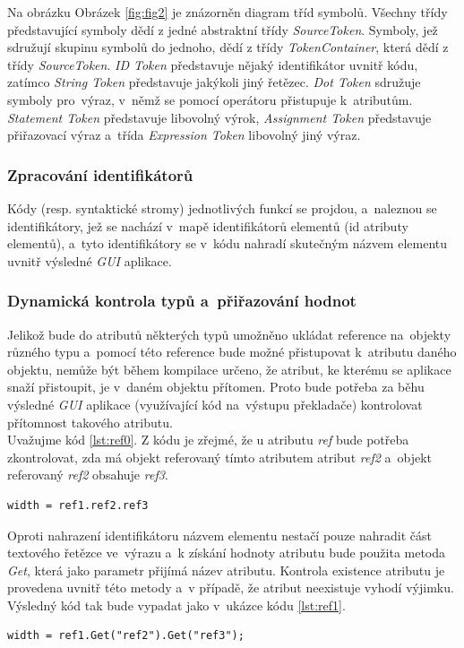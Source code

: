 \documentclass[11pt,twoside,a4paper]{book}
\begin{document}
Na obrázku Obrázek \ref{fig:fig2} je znázorněn diagram tříd symbolů. Všechny třídy představující symboly dědí z jedné abstraktní třídy \textit{SourceToken}. Symboly, jež sdružují skupinu symbolů do jednoho, dědí z třídy \textit{TokenContainer}, která dědí z třídy \textit{SourceToken}. \textit{ID Token} představuje nějaký identifikátor uvnitř kódu, zatímco \textit{String Token} představuje jakýkoli jiný řetězec. \textit{Dot Token} sdružuje symboly pro~výraz, v~němž se pomocí operátoru  přistupuje k~atributům. \textit{Statement Token} představuje libovolný výrok, \textit{Assignment Token} představuje přiřazovací výraz a~třída \textit{Expression Token} libovolný jiný výraz.

\subsubsection{Zpracování identifikátorů}
Kódy (resp. syntaktické stromy) jednotlivých funkcí se projdou, a~naleznou se identifikátory, jež se nachází v~mapě identifikátorů elementů (id atributy elementů), a~tyto identifikátory se v~kódu nahradí skutečným názvem elementu uvnitř výsledné \textit{GUI} aplikace.
\subsubsection{Dynamická kontrola typů a~přiřazování hodnot}
Jelikož bude do atributů některých typů umožněno ukládat reference na~objekty různého typu a~pomocí této reference bude možné přistupovat k~atributu daného objektu, nemůže být během kompilace určeno, že atribut, ke kterému se aplikace snaží přistoupit, je v~daném objektu přítomen. Proto bude potřeba za běhu výsledné \textit{GUI} aplikace (využívající kód na~výstupu překladače) kontrolovat přítomnost takového atributu.\\
Uvažujme kód \ref{lst:ref0}. Z kódu je zřejmé, že u atributu \textit{ref} bude potřeba zkontrolovat, zda má objekt referovaný tímto atributem atribut \textit{ref2} a~objekt referovaný \textit{ref2} obsahuje \textit{ref3}.

\begin{lstlisting}[frame=single,caption=Pseudokód problematického použití operátoru \uv{.} v~přiřazovacím výroku. \label{lst:ref0}]
width = ref1.ref2.ref3
\end{lstlisting}
Oproti nahrazení identifikátoru názvem elementu nestačí pouze nahradit část textového řetězce ve~výrazu a~k získání hodnoty atributu bude použita metoda \textit{Get}, která jako parametr přijímá název atributu. Kontrola existence atributu je provedena uvnitř této metody a~v případě, že atribut neexistuje vyhodí výjimku. Výsledný kód tak bude vypadat jako v~ukázce kódu \ref{lst:ref1}.
\begin{lstlisting}[frame=single,caption=Řešení v~pseudokódu problematického použití operátoru \uv{.} v~přiřazovacím výroku. \label{lst:ref1}]
width = ref1.Get("ref2").Get("ref3");
\end{lstlisting}
\end{document}
